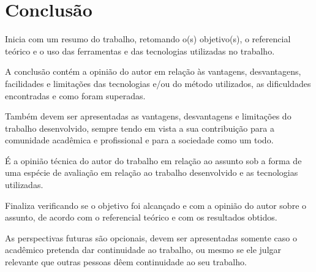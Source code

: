 \chapter{Conclusão}\label{cap:conclusoeseperspectivas}

Inicia com um resumo do trabalho, retomando o(s) objetivo(s), o referencial teórico e o uso das ferramentas e das tecnologias utilizadas no trabalho.

A conclusão contém a opinião do autor em relação às vantagens, desvantagens, facilidades e limitações das tecnologias e/ou do método utilizados, as dificuldades encontradas e como foram superadas.

Também devem ser apresentadas as vantagens, desvantagens e limitações do trabalho desenvolvido, sempre tendo em vista a sua contribuição para a comunidade acadêmica e profissional e para a sociedade como um todo.

É a opinião técnica do autor do trabalho em relação ao assunto sob a forma de uma espécie de avaliação em relação ao trabalho desenvolvido e as tecnologias utilizadas.

Finaliza verificando se o objetivo foi alcançado e com a opinião do autor sobre o assunto, de acordo com o referencial teórico e com os resultados obtidos.

As perspectivas futuras são opcionais, devem ser apresentadas somente caso o acadêmico pretenda dar continuidade ao trabalho, ou mesmo se ele julgar relevante que outras pessoas dêem continuidade ao seu trabalho.
